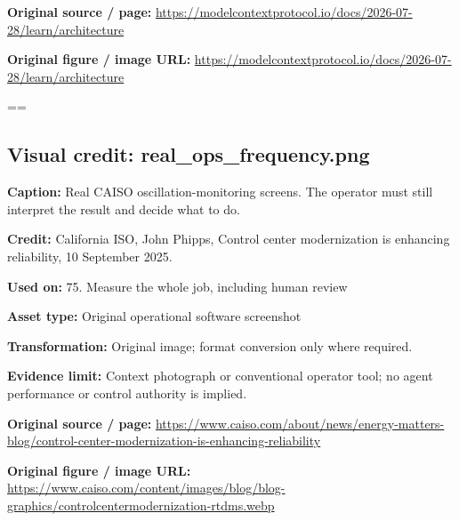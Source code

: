 \documentclass[10pt,letterpaper]{article}
\begin{document}
\textbf{Original source / page:} \href{https://modelcontextprotocol.io/docs/2026-07-28/learn/architecture}{\small\ttfamily https:/\allowbreak{}/\allowbreak{}modelcontextprotocol.\allowbreak{}io/\allowbreak{}docs/\allowbreak{}2026-\allowbreak{}07-\allowbreak{}28/\allowbreak{}learn/\allowbreak{}architecture}\par
\textbf{Original figure / image URL:} \href{https://modelcontextprotocol.io/docs/2026-07-28/learn/architecture}{\small\ttfamily https:/\allowbreak{}/\allowbreak{}modelcontextprotocol.\allowbreak{}io/\allowbreak{}docs/\allowbreak{}2026-\allowbreak{}07-\allowbreak{}28/\allowbreak{}learn/\allowbreak{}architecture}\par
\egroup\par\noindent\box\readingEntry\par\medskip
\setbox\readingEntry=\vbox\bgroup\hsize=\linewidth\subsection*{Visual credit: real\_ops\_frequency.png}
\textbf{Caption:} Real CAISO oscillation-monitoring screens. The operator must still interpret the result and decide what to do.\par
\textbf{Credit:} California ISO, John Phipps, Control center modernization is enhancing reliability, 10 September 2025.\par
\textbf{Used on:} 75. Measure the whole job, including human review\par
\textbf{Asset type:} Original operational software screenshot\par
\textbf{Transformation:} Original image; format conversion only where required.\par
\textbf{Evidence limit:} Context photograph or conventional operator tool; no agent performance or control authority is implied.\par
\textbf{Original source / page:} \href{https://www.caiso.com/about/news/energy-matters-blog/control-center-modernization-is-enhancing-reliability}{\small\ttfamily https:/\allowbreak{}/\allowbreak{}www.\allowbreak{}caiso.\allowbreak{}com/\allowbreak{}about/\allowbreak{}news/\allowbreak{}energy-\allowbreak{}matters-\allowbreak{}blog/\allowbreak{}control-\allowbreak{}center-\allowbreak{}modernization-\allowbreak{}is-\allowbreak{}enhancing-\allowbreak{}reliability}\par
\textbf{Original figure / image URL:} \href{https://www.caiso.com/content/images/blog/blog-graphics/controlcentermodernization-rtdms.webp}{\small\ttfamily https:/\allowbreak{}/\allowbreak{}www.\allowbreak{}caiso.\allowbreak{}com/\allowbreak{}content/\allowbreak{}images/\allowbreak{}blog/\allowbreak{}blog-\allowbreak{}graphics/\allowbreak{}controlcentermodernization-\allowbreak{}rtdms.\allowbreak{}webp}\par
\end{document}
